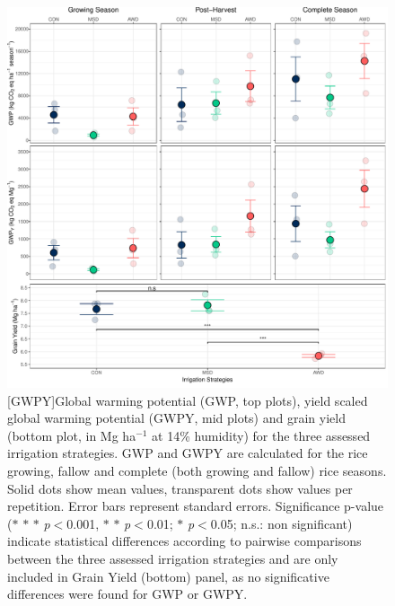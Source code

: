 \begin{figure} [ht]
\captionsetup{justification=justified}
	\centering 
	\includegraphics[scale=0.45, center]{Figures/Chapter_2/Yield_GWP_GWPY_arr.pdf}
	[GWPY]{Global warming potential (GWP, top plots), yield scaled global warming potential (GWPY, mid plots) and grain yield (bottom plot, in Mg ha$^{-1}$ at 14\% humidity) for the three assessed irrigation strategies. GWP and GWPY are calculated for the rice growing, fallow and complete (both growing and fallow) rice seasons. Solid dots show mean values, transparent dots show values per repetition. Error bars represent standard errors. Significance p-value ($\ast$ $\ast$ $\ast$ \textit{p}$<$0.001, $\ast$ $\ast$ \textit{p}$<$0.01; $\ast$ \textit{p}$<$0.05; n.s.: non significant) indicate statistical differences according to pairwise comparisons between the three assessed irrigation strategies and are only included in Grain Yield (bottom) panel, as no significative differences were found for GWP or GWPY.}  
	\label{GWPY}
\end{figure}

